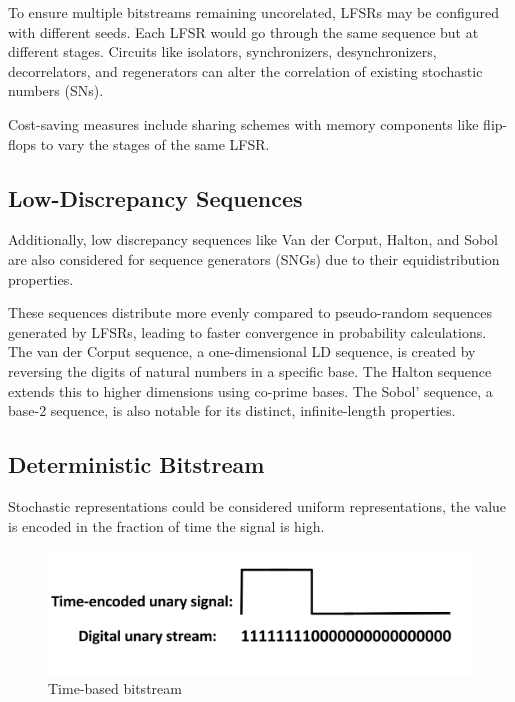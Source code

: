 To ensure multiple bitstreams remaining uncorelated, LFSRs may be configured with different seeds. Each LFSR would go through the same sequence but at different stages. Circuits like 
isolators, synchronizers, desynchronizers, decorrelators, and regenerators can alter the correlation of existing stochastic numbers (SNs).

Cost-saving measures include sharing schemes with memory components like flip-flops to vary the stages of the same LFSR.

\subsection {Low-Discrepancy Sequences}

Additionally, low discrepancy sequences like Van der Corput, Halton, and Sobol are also considered for sequence generators (SNGs) due to their equidistribution properties.

These sequences distribute more evenly compared to
pseudo-random sequences generated by LFSRs, leading to faster convergence in
probability calculations. The van der Corput sequence, a one-dimensional LD
sequence, is created by reversing the digits of natural numbers in a specific
base. The Halton sequence extends this to higher dimensions using co-prime bases.
The Sobol' sequence, a base-2 sequence, is also notable for its distinct,
infinite-length properties.


\subsection{Deterministic Bitstream}

Stochastic representations could be considered uniform representations, the value is encoded in
the fraction of time the signal is high. 


\begin{figure}[htb]
	\includegraphics[width=12cm]{gfx/Time-encode signal.png}
	\caption{Time-based bitstream}
	\label{fig:system:example1}
\end{figure}



